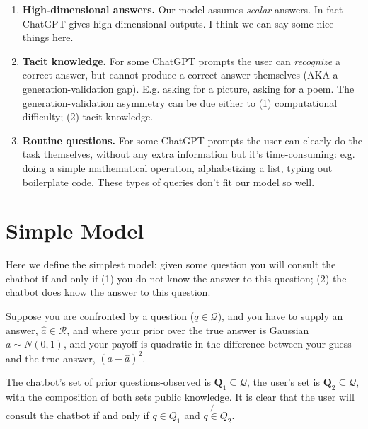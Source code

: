 \documentclass[\ifdraft draft\fi]{article}
\begin{document}
\begin{enumerate}
   \item \textbf{High-dimensional answers.} Our model assumes \textit{scalar} answers. In fact ChatGPT gives high-dimensional outputs. I think we can say some nice things here.
    
    \item \textbf{Tacit knowledge.} For some ChatGPT prompts the user can \textit{recognize} a correct answer, but cannot produce a correct answer themselves (AKA a generation-validation gap). E.g. asking for a picture, asking for a poem. The generation-validation asymmetry can be due either to (1) computational difficulty; (2) tacit knowledge.
    
    \item \textbf{Routine questions.} For some ChatGPT prompts the user can clearly do the task themselves, without any extra information but it's time-consuming: e.g. doing a simple mathematical operation, alphabetizing a list, typing out boilerplate code. These types of queries don't fit our model so well.

\end{enumerate}


\section{Simple Model}

Here we define the simplest model: given some question you will consult the chatbot if and only if (1) you do not know the answer to this question; (2) the chatbot does know the answer to this question.

Suppose you are confronted by a question ($q\in\mathcal{Q}$), and you have to supply an answer, $\hat{a}\in\mathcal{R}$, and where your prior over the true answer is Gaussian $a\sim N(0,1)$, and your payoff is quadratic in the difference between your guess and the true answer, $(a-\hat{a})^2$.

The chatbot's set of prior questions-observed is $\bm{Q}_1\subseteq \mathcal{Q}$, the user's set is $\bm{Q}_2\subseteq \mathcal{Q}$, with the composition of both sets public knowledge. It is clear that the user will consult the chatbot if and only if $q\in Q_1$ and $q\not{\in}Q_2$.
\end{document}
